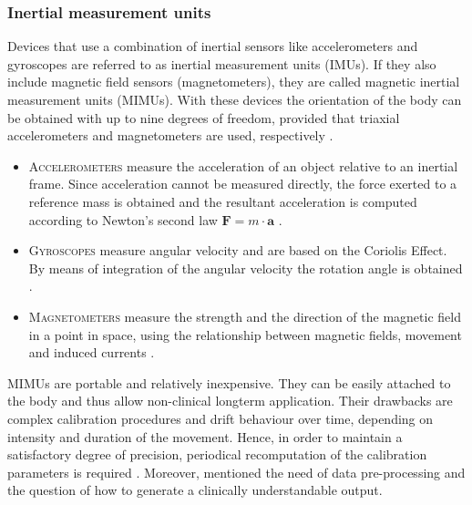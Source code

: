 \subsubsection{Inertial measurement units} Devices that use a combination of inertial sensors like accelerometers and gyroscopes are referred to as inertial measurement units (IMUs). If they also include magnetic field sensors (magnetometers), they are called magnetic inertial measurement units (MIMUs). With these devices the orientation of the body can be obtained with up to nine degrees of freedom, provided that triaxial accelerometers and magnetometers are used, respectively \cite{olivares_vicente_signal_2013}.

\begin{itemize}

\item \textsc{Accelerometers} measure the acceleration of an object relative to an inertial frame. Since acceleration cannot be measured directly, the force exerted to a reference mass is obtained and the resultant acceleration is computed according to Newton's second law $ \mathbf{F} = m \cdot \mathbf a $ \cite{encyclopedia_britannica_accelerometer_2014}.

\item \textsc{Gyroscopes} measure angular velocity and are based on the Coriolis Effect. By means of integration of the angular velocity the rotation angle is obtained \cite{olivares_vicente_signal_2013}.

\item \textsc{Magnetometers} measure the strength and the direction of the magnetic field in a point in space, using the relationship between magnetic fields, movement and induced currents \cite{olivares_vicente_signal_2013}.
 
\end{itemize}
MIMUs are portable and relatively inexpensive. They can be easily attached to the body and thus allow non-clinical longterm application. Their drawbacks are complex calibration procedures and drift behaviour over time, depending on intensity and duration of the movement. Hence, in order to maintain a satisfactory degree of precision, periodical recomputation of the calibration parameters is required \cite{olivares_vicente_signal_2013}. Moreover, \citeauthor{mancini_isway:_2012} \cite{mancini_isway:_2012} mentioned the need of data pre-processing and the question of how to generate a clinically understandable output.

